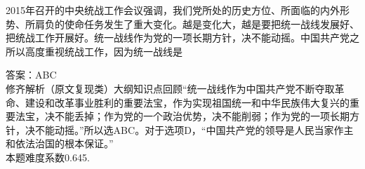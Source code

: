 \question 2015年召开的中央统战工作会议强调，我们党所处的历史方位、所面临的内外形势、所肩负的使命任务发生了重大变化。越是变化大，越是要把统一战线发展好、把统战工作开展好。统一战线作为党的一项长期方针，决不能动摇。中国共产党之所以高度重视统战工作，因为统一战线是
\par{}
\begin{solution}答案：ABC\\
修齐解析（原文复现类）大纲知识点回顾``统一战线作为中国共产党不断夺取革命、建设和改革事业胜利的重要法宝，作为实现祖国统一和中华民族伟大复兴的重要法宝，决不能丢掉；作为党的一个政治优势，决不能削弱；作为党的一项长期方针，决不能动摇。''所以选ABC。对于选项D，``中国共产党的领导是人民当家作主和依法治国的根本保证。''\\
本题难度系数0.645.
\end{solution}
